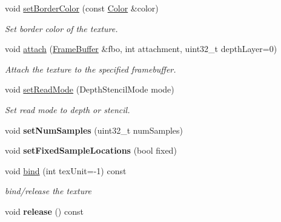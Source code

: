 \begin{Indent}
\begin{DoxyCompactItemize}
void \mbox{\hyperlink{classrev_1_1_texture_a93784b6ee73a8fa093253e843eeebd9b}{set\+Border\+Color}} (const \mbox{\hyperlink{classrev_1_1_color}{Color}} \&color)
\begin{DoxyCompactList}\small\item\em Set border color of the texture. \end{DoxyCompactList}\item 
void \mbox{\hyperlink{classrev_1_1_texture_a30f599dafc75209703110b96792f6842}{attach}} (\mbox{\hyperlink{classrev_1_1_frame_buffer}{Frame\+Buffer}} \&fbo, int attachment, uint32\+\_\+t depth\+Layer=0)
\begin{DoxyCompactList}\small\item\em Attach the texture to the specified framebuffer. \end{DoxyCompactList}\item 
\mbox{\label{classrev_1_1_texture_af8f877c5a78703dc3152c4ac30887bc7}} 
void \mbox{\hyperlink{classrev_1_1_texture_af8f877c5a78703dc3152c4ac30887bc7}{set\+Read\+Mode}} (Depth\+Stencil\+Mode mode)
\begin{DoxyCompactList}\small\item\em Set read mode to depth or stencil. \end{DoxyCompactList}\item 
\mbox{\label{classrev_1_1_texture_af419afd3e71581892f9697081a683353}} 
void {\bfseries set\+Num\+Samples} (uint32\+\_\+t num\+Samples)
\item 
\mbox{\label{classrev_1_1_texture_ad8b49b0821edca275bc16bae1fe7ea0d}} 
void {\bfseries set\+Fixed\+Sample\+Locations} (bool fixed)
\item 
\mbox{\label{classrev_1_1_texture_a70447d1baf43dc4aaa9fa59e41d45dd0}} 
void \mbox{\hyperlink{classrev_1_1_texture_a70447d1baf43dc4aaa9fa59e41d45dd0}{bind}} (int tex\+Unit=-\/1) const
\begin{DoxyCompactList}\small\item\em bind/release the texture \end{DoxyCompactList}\item 
\mbox{\label{classrev_1_1_texture_aec7c6d8f2992ec309a69f069d6e863cf}} 
void {\bfseries release} () const
\item 

\end{DoxyCompactItemize}
\end{Indent}
